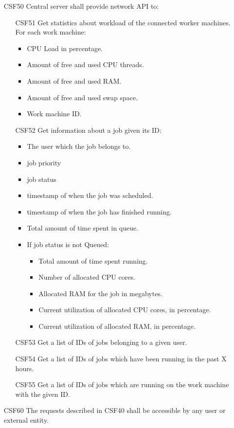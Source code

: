 \begin{enumerate}
  \item[CSF50] Central server shall provide network API to:
  \begin{enumerate}
    \item[CSF51] Get statistics about workload of the connected worker machines.
      For each work machine:
      \begin{itemize}
        \item CPU Load in percentage.
        \item Amount of free and used CPU threads.
        \item Amount of free and used RAM.
        \item Amount of free and used swap space.
        \item Work machine \gls{ID}.
      \end{itemize}
    \item[CSF52] Get information about a job given its \gls{ID}:
    \begin{itemize}
      \item The user which the job belongs to.
      \item \Gls{job priority}
      \item \Gls{job status}
      \item \Gls{timestamp} of when the job was scheduled.
      \item \Gls{timestamp} of when the job has finished running.
      \item Total amount of time spent in queue.
      \item If \gls{job status} is not Queued:
      \begin{itemize}
        \item Total amount of time spent running.
        \item Number of allocated CPU cores.
        \item Allocated RAM for the job in megabytes.
        \item Current utilization of allocated CPU cores, in percentage.
        \item Current utilization of allocated RAM, in percentage.
      \end{itemize}
    \end{itemize}
    \item[CSF53] Get a list of \glspl{ID} of jobs belonging to a given user.
    \item[CSF54] Get a list of \glspl{ID} of jobs which have been running in the
      past X hours.
    \item[CSF55] Get a list of \glspl{ID} of jobs which are running on the work machine with the given
      \gls{ID}.
  \end{enumerate}
  \item[CSF60] The requests described in CSF40 shall be accessible by any user or external entity.
\end{enumerate}
